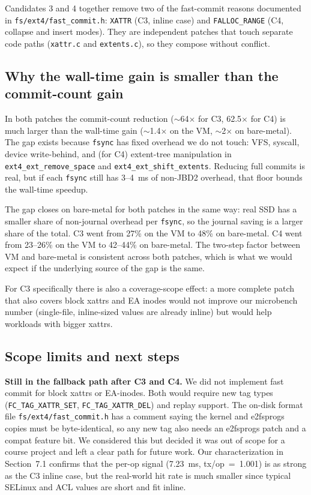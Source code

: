 \documentclass[11pt,a4paper]{article}
\begin{document}
Candidates 3 and 4 together remove two of the fast-commit reasons
documented in \texttt{fs/ext4/fast\_commit.h}: \texttt{XATTR} (C3,
inline case) and \texttt{FALLOC\_RANGE} (C4, collapse and insert
modes). They are independent patches that touch separate code paths
(\texttt{xattr.c} and \texttt{extents.c}), so they compose without
conflict.

\subsection{Why the wall-time gain is smaller than the commit-count gain}

In both patches the commit-count reduction ($\sim$64$\times$ for
C3, 62.5$\times$ for C4) is much larger than the wall-time gain
($\sim$1.4$\times$ on the VM, $\sim$2$\times$ on bare-metal). The
gap exists because \texttt{fsync} has fixed overhead we do not
touch: VFS, syscall, device write-behind, and (for C4) extent-tree
manipulation in \texttt{ext4\_ext\_remove\_space} and
\texttt{ext4\_ext\_shift\_extents}. Reducing full commits is real,
but if each \texttt{fsync} still has 3--4~ms of non-JBD2 overhead,
that floor bounds the wall-time speedup.

The gap closes on bare-metal for both patches in the same way:
real SSD has a smaller share of non-journal overhead per
\texttt{fsync}, so the journal saving is a larger share of the
total. C3 went from 27\% on the VM to 48\% on bare-metal. C4 went
from 23--26\% on the VM to 42--44\% on bare-metal. The two-step
factor between VM and bare-metal is consistent across both patches,
which is what we would expect if the underlying source of the gap
is the same.

For C3 specifically there is also a coverage-scope effect: a more
complete patch that also covers block xattrs and EA inodes would not
improve our microbench number (single-file, inline-sized values are
already inline) but would help workloads with bigger xattrs.

\subsection{Scope limits and next steps}

\textbf{Still in the fallback path after C3 and C4.} We did not
implement fast commit for block xattrs or EA-inodes. Both would
require new tag types (\texttt{FC\_TAG\_XATTR\_SET},
\texttt{FC\_TAG\_XATTR\_DEL}) and replay support. The on-disk
format file \texttt{fs/ext4/fast\_commit.h} has a comment saying
the kernel and e2fsprogs copies must be byte-identical, so any new
tag also needs an e2fsprogs patch and a compat feature bit. We
considered this but decided it was out of scope for a course
project and left a clear path for future work. Our
characterization in Section~7.1 confirms that the per-op signal
(7.23~ms, tx/op~=~1.001) is as strong as the C3 inline case, but
the real-world hit rate is much smaller since typical SELinux and
ACL values are short and fit inline.
\end{document}
